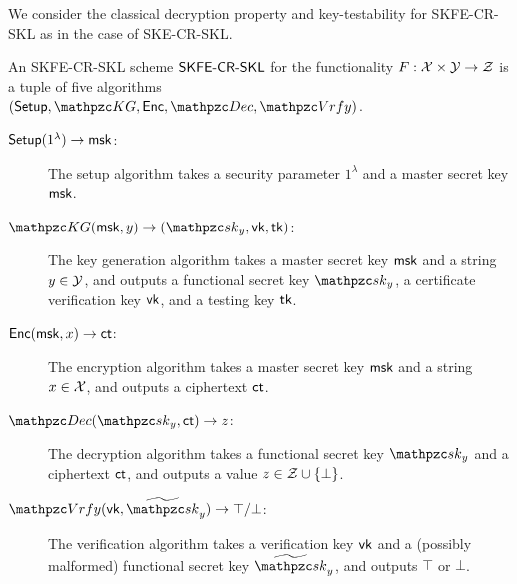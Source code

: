 We consider the classical decryption property and key-testability for
SKFE-CR-SKL as in the case of SKE-CR-SKL.
\begin{definition}
An SKFE-CR-SKL scheme $\mathsf{SKFE}\textrm{-}\mathsf{CR}\textrm{-}\mathsf{SKL}$ for the functionality $F: \mathcal{X} \times
\mathcal{Y} \rightarrow \mathcal{Z}$ is a tuple
of five algorithms $(\Setup,\qKG, \Enc, \allowbreak\qDec,\qVrfy)$.
\begin{description}
\item[$\mathsf{Setup}(1^\lambda)\rightarrow\mathsf{msk}$:] The setup algorithm takes a security parameter $1^\lambda$ and a master secret key $\mathsf{msk}$.

\item[$\qKG(\msk,y)\ra(\qsk_y,\vk,\tk)$:] The key generation algorithm
takes a master secret key $\mathsf{msk}$ and a string $y \in \mathcal{Y}$, and
outputs a functional secret key $\qsk_y$, a certificate verification
key $\mathsf{vk}$, and a testing key $\mathsf{tk}$.

\item[$\mathsf{Enc}(\mathsf{msk},x)\rightarrow\mathsf{ct}$:] The encryption algorithm takes a master
secret key $\mathsf{msk}$ and a string $x \in \mathcal{X}$, and outputs a ciphertext $\mathsf{ct}$.

\item[$\qDec(\qsk_y,\ct)\ra z$:] The decryption algorithm takes a
functional secret key $\qsk_y$ and a ciphertext $\mathsf{ct}$, and outputs a
value $z \in \mathcal{Z} \cup \{\bot\}$.


\item[$\qVrfy(\vk,\widetilde{\qsk}_y)\ra\top/\bot$:] The verification algorithm takes a verification key $\mathsf{vk}$ and a (possibly malformed) functional secret key $\widetilde{\qsk}_y$, and outputs $\top$ or $\bot$.





\end{description}
\end{definition}
